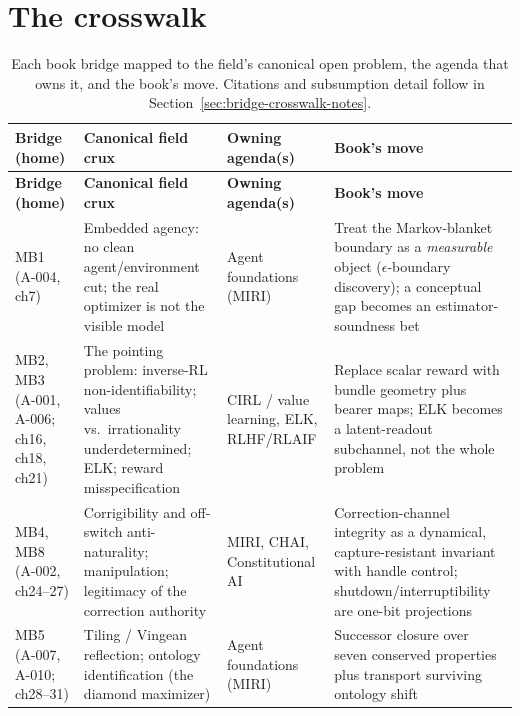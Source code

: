 \section{The crosswalk}
\label{sec:bridge-crosswalk-table}

\renewcommand{\arraystretch}{1.25}
\begin{longtable}{@{}p{}p{}p{}p{}@{}}
\caption{Each book bridge mapped to the field's canonical open problem, the agenda that owns it, and the book's move. Citations and subsumption detail follow in Section~\ref{sec:bridge-crosswalk-notes}.}\label{tab:bridge-crosswalk}\\
\toprule
\textbf{Bridge (home)} & \textbf{Canonical field crux} & \textbf{Owning agenda(s)} & \textbf{Book's move} \\
\midrule
\endfirsthead
\toprule
\textbf{Bridge (home)} & \textbf{Canonical field crux} & \textbf{Owning agenda(s)} & \textbf{Book's move} \\
\midrule
\endhead
\bottomrule
\endfoot
MB1 \newline (A-004, ch7) & Embedded agency: no clean agent/environment cut; the real optimizer is not the visible model & Agent foundations (MIRI) & Treat the Markov-blanket boundary as a \emph{measurable} object (\(\epsilon\)-boundary discovery); a conceptual gap becomes an estimator-soundness bet \\
MB2, MB3 \newline (A-001, A-006; ch16, ch18, ch21) & The pointing problem: inverse-RL non-identifiability; values vs.\ irrationality underdetermined; ELK; reward misspecification & CIRL / value learning, ELK, RLHF/RLAIF & Replace scalar reward with bundle geometry plus bearer maps; ELK becomes a latent-readout subchannel, not the whole problem \\
MB4, MB8 \newline (A-002, ch24--27) & Corrigibility and off-switch anti-naturality; manipulation; legitimacy of the correction authority & MIRI, CHAI, Constitutional AI & Correction-channel integrity as a dynamical, capture-resistant invariant with handle control; shutdown/interruptibility are one-bit projections \\
MB5 \newline (A-007, A-010; ch28--31) & Tiling / Vingean reflection; ontology identification (the diamond maximizer) & Agent foundations (MIRI) & Successor closure over seven conserved properties plus transport surviving ontology shift \\

\end{longtable}

